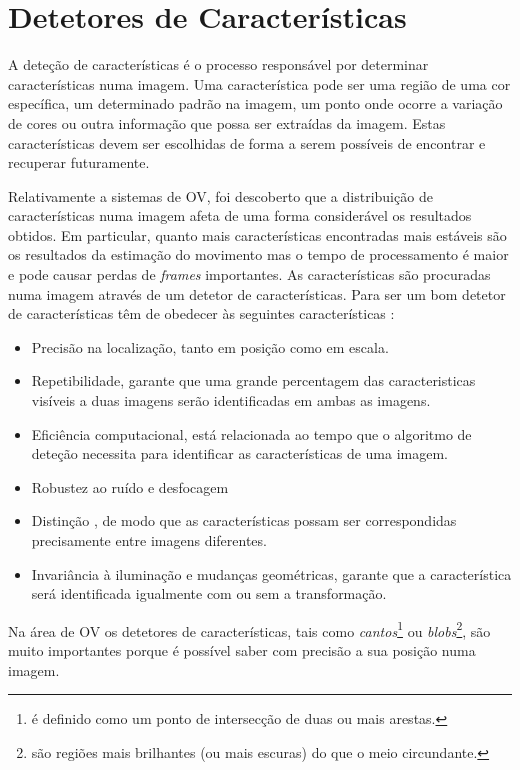 \section{Detetores de Características}\label{detCar}

A deteção de características é o processo responsável por determinar características numa imagem. Uma característica pode ser uma região de uma cor específica, um determinado padrão na imagem, um ponto onde ocorre a variação de cores ou outra informação que possa ser extraídas da imagem. Estas características devem ser escolhidas de forma a serem possíveis de encontrar e recuperar futuramente. 

Relativamente a sistemas de OV, foi descoberto que a distribuição de características numa imagem afeta de uma forma considerável os resultados obtidos. Em particular, quanto mais características encontradas mais estáveis são os resultados da estimação do movimento mas o tempo de processamento é maior e pode causar perdas de \textit{frames} importantes. As características são procuradas numa imagem através de um detetor de características. Para ser um bom detetor de características têm de obedecer às seguintes características \cite{Fraundorfer2012}:
\begin{itemize}
	\item Precisão na localização, tanto em posição como em escala.
	\item Repetibilidade, garante que uma grande percentagem das caracteristicas visíveis a duas imagens serão identificadas em ambas as imagens.
	\item Eficiência computacional, está relacionada ao tempo que o algoritmo de deteção necessita para identificar as características de uma imagem.
	\item Robustez ao ruído e desfocagem
	\item Distinção , de modo que as características possam ser correspondidas precisamente entre imagens diferentes.
	\item Invariância à iluminação e mudanças geométricas, garante que a característica será identificada igualmente com ou sem a transformação.
\end{itemize}

Na área de OV os detetores de características, tais como \textit{cantos}\footnote{é definido como um ponto de intersecção de duas ou mais arestas.} ou \textit{blobs}\footnote{são regiões mais brilhantes (ou mais escuras) do que o meio circundante.}, são muito importantes porque é possível saber com precisão a sua posição numa imagem. 

